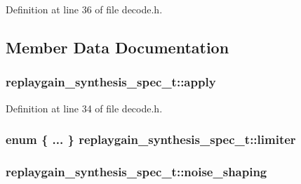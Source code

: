 Definition at line 36 of file decode.\+h.



\subsection{Member Data Documentation}
\subsubsection[{\texorpdfstring{apply}{apply}}]{ replaygain\+\_\+synthesis\+\_\+spec\+\_\+t\+::apply}\hypertarget{structreplaygain__synthesis__spec__t_a7a6f8e7d818b3b022df0af9c258b657d}{}\label{structreplaygain__synthesis__spec__t_a7a6f8e7d818b3b022df0af9c258b657d}


Definition at line 34 of file decode.\+h.

\subsubsection[{\texorpdfstring{limiter}{limiter}}]{\setlength{\rightskip}{0pt plus 5cm}enum \{ ... \}   replaygain\+\_\+synthesis\+\_\+spec\+\_\+t\+::limiter}\hypertarget{structreplaygain__synthesis__spec__t_a72c08d263b3fb5a1c9bfcf45ed189c38}{}\label{structreplaygain__synthesis__spec__t_a72c08d263b3fb5a1c9bfcf45ed189c38}
\subsubsection[{\texorpdfstring{noise\+\_\+shaping}{noise_shaping}}]{ replaygain\+\_\+synthesis\+\_\+spec\+\_\+t\+::noise\+\_\+shaping}\hypertarget{structreplaygain__synthesis__spec__t_a9554b9cb873391212e2e23bb0bbf8bca}{}\label{structreplaygain__synthesis__spec__t_a9554b9cb873391212e2e23bb0bbf8bca}


